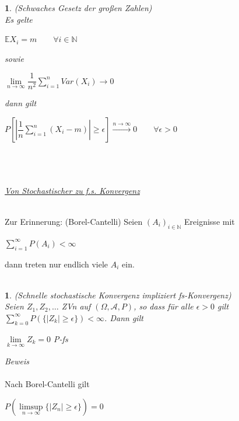 \documentclass[10pt,a4paper]{report}
\numberwithin{equation}{section}
\numberwithin{figure}{section}
\theoremstyle{plain}
\theoremstyle{definition}
\theoremstyle{plain}
\newtheorem{prop}{\protect\propositionname}[section]
\theoremstyle{definition}
\theoremstyle{remark}
\theoremstyle{plain}
\newtheorem{lem}{\protect\lemmaname}[section]
\theoremstyle{plain}
\theoremstyle{plain}
\theoremstyle{plain}
\theoremstyle{plain}
\providecommand{\lemmaname}{Lemma}
\providecommand{\propositionname}{Satz}
\newcommand{\1}{ \mathbb{1} } %
\begin{document}
\begin{prop} (Schwaches Gesetz der großen Zahlen) \\
  Es gelte
  \begin{center}
    $\mathbb{E}X_i=m\qquad \forall i \in \mathbb{N}$
  \end{center}
  sowie
  \begin{center}
    $\lim\limits_{n \to \infty}
    \dfrac{1}{n^2}\sum\limits_{i=1}^nVar(X_i) \to 0$
  \end{center}
  dann gilt
  \begin{center}
    $P\left[\left|\dfrac{1}{n}\sum\limits_{i=1}^n(X_i-m)\right|\geq
      \epsilon\right] \overset{n \to \infty}{\to} 0 \qquad \forall
    \epsilon >0$
  \end{center}
  $ $\\\\\\
  \underline{Von Stochastischer zu f.s. Konvergenz}\\\\
\end{prop}
Zur Erinnerung: (Borel-Cantelli) Seien $(A_i)_{i \in \mathbb{N}}$ Ereignisse mit
\begin{center}
$\sum\limits_{i=1}^\infty P(A_i) < \infty $
\end{center} 
dann treten nur endlich viele $A_i$ ein.\\\\
\begin{lem} (Schnelle stochastische Konvergenz impliziert fs-Konvergenz)\\
  Seien $Z_1, Z_2,\ldots$ ZVn auf $(\Omega,\mathcal{A},P)$, so dass
  für alle $\epsilon >0$ gilt $\sum\limits_{k=0}^\infty P(\{|Z_k|\geq
  \epsilon\})< \infty $. Dann gilt
  \begin{center}
    $\lim\limits_{k \to \infty} Z_k=0$ P-fs
  \end{center}
\end{lem}
\textit{Beweis}\\\\
Nach Borel-Cantelli gilt
\begin{center}
$P\left(\limsup\limits_{n \to \infty}\{|Z_n|\geq \epsilon\}\right)=0$
\end{center}
\end{document}
